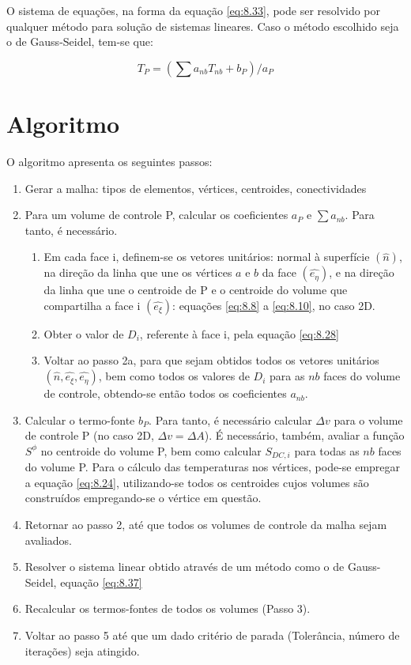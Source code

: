 O sistema de equações, na forma da equação \ref{eq:8.33}, pode ser resolvido por qualquer método para solução de sistemas lineares. Caso o método escolhido seja o de Gauss-Seidel, tem-se que:

\begin{equation}
    \label{eq:8.37}
    T_P = (\sum a_{nb}T_{nb}+b_P)/a_P
\end{equation}

\section{Algoritmo}

O algoritmo apresenta os seguintes passos:

\begin{enumerate}
    \item Gerar a malha: tipos de elementos, vértices, centroides, conectividades
    \item Para um volume de controle P, calcular os coeficientes $a_P$ e $\sum a_{nb}$. Para tanto, é necessário.
    \begin{enumerate}
        \item Em cada face i, definem-se os vetores unitários: normal à superfície $(\hat{n})$, na direção da linha que une os vértices $a$ e $b$ da face $(\hat{e_\eta})$, e na direção da linha que une o centroide de P e o centroide do volume que compartilha a face i $(\hat{e_\xi})$: equações \ref{eq:8.8} a \ref{eq:8.10}, no caso 2D.
        \item Obter o valor de $D_i$, referente à face i, pela equação \ref{eq:8.28}
        \item Voltar ao passo 2a, para que sejam obtidos todos os vetores unitários $(\hat{n}, \hat{e_\xi}, \hat{e_\eta})$, bem como todos os valores de $D_i$ para as $nb$ faces do volume de controle, obtendo-se então todos os coeficientes $a_{nb}$.
    \end{enumerate}
    \item Calcular o termo-fonte $b_P$. Para tanto, é necessário calcular $\Delta v$ para o volume de controle P (no caso 2D, $\Delta v = \Delta A$). É necessário, também, avaliar a função $S^\phi$ no centroide do volume P, bem como calcular $S_{DC,i}$ para todas as $nb$ faces do volume P. Para o cálculo das temperaturas nos vértices, pode-se empregar a equação \ref{eq:8.24}, utilizando-se todos os centroides cujos volumes são construídos empregando-se o vértice em questão.
    \item Retornar ao passo 2, até que todos os volumes de controle da malha sejam avaliados.
    \item Resolver o sistema linear obtido através de um método como o de Gauss-Seidel, equação \ref{eq:8.37}
    \item Recalcular os termos-fontes de todos os volumes (Passo 3).
    \item Voltar ao passo 5 até que um dado critério de parada (Tolerância, número de iterações) seja atingido.
\end{enumerate}

